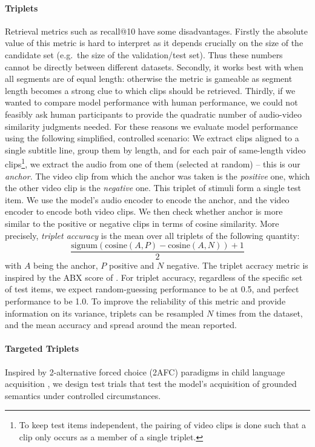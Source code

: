 \paragraph{Triplets}
Retrieval metrics such as recall@10 have some disadvantages. Firstly
the absolute value of this metric is hard to interpret as it depends
crucially on the size of the candidate set (e.g.\ the size of the
validation/test set). Thus these numbers cannot be directly between
different datasets. Secondly, it works best with when all segments are
of equal length: otherwise the metric is gameable as segment length
becomes a strong clue to which clips should be retrieved. Thirdly, if
we wanted to compare model performance with human performance, we
could not feasibly ask human participants to provide the quadratic
number of audio-video similarity judgments needed. For these reasons
we evaluate model performance using the following simplified,
controlled scenario: We extract clips aligned to a single subtitle
line, group them by length, and for each pair of same-length video
clips\footnote{To keep test items independent, the pairing of video
  clips is done such that a clip only occurs as a member of a single
  triplet.}, we extract the audio from one of them (selected at
random) -- this is our {\it anchor}. The video clip from which the
anchor was taken is the {\it positive} one, which the other video clip
is the {\it negative} one. This triplet of stimuli form a single test
item.  We use the model's audio encoder to encode the anchor, and the
video encoder to encode both video clips. We then check whether anchor
is more similar to the positive or negative clips in terms of cosine
similarity.  More precisely, {\it triplet accuracy} is the mean over
all triplets of the following quantity:
\begin{equation}
  \frac{\mathrm{signum}(\mathrm{cosine}(A, P) - \mathrm{cosine}(A, N)) + 1}{2}
  \label{eq:triplet-acc}
\end{equation}
with $A$ being the anchor, $P$ positive and $N$ negative. The triplet
accracy metric is inspired by the ABX score of \citet{schatz2016abx}.
For triplet accuracy, regardless of the specific set of test items, we
expect random-guessing performance to be at 0.5, and perfect
performance to be 1.0.  To improve the reliability of this metric and
provide information on its variance, triplets can be resampled $N$
times from the dataset, and the mean accuracy and spread around the mean
reported.

\paragraph{Targeted Triplets}
Inspired by 2-alternative forced choice (2AFC) paradigms in child language acquisition \citep{noble2011comprehension, bergelson20126}, we design test trials that test the model's acquisition of grounded semantics under controlled circumstances.

